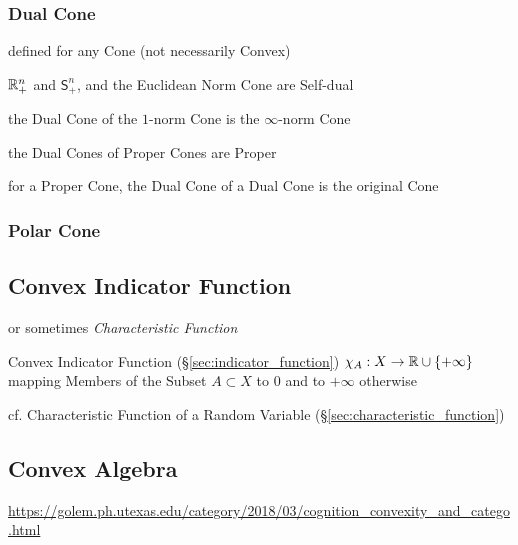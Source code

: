 {\subsubsection{Dual Cone}\label{sec:dual_cone}

defined for any Cone (not necessarily Convex)

$\mathbb{R}_+^n$ and $\mathsf{S}_+^n$, and the Euclidean Norm Cone are Self-dual

the Dual Cone of the $1$-norm Cone is the $\infty$-norm Cone

the Dual Cones of Proper Cones are Proper

for a Proper Cone, the Dual Cone of a Dual Cone is the original Cone



\subsubsection{Polar Cone}\label{sec:polar_cone}



\subsection{Convex Indicator Function}\label{sec:convex_indicator_function}

or sometimes \emph{Characteristic Function}

Convex Indicator Function (\S\ref{sec:indicator_function})
$\chi_A : X \rightarrow \mathbb{R} \cup \{ +\infty \}$ mapping Members of the Subset
$A \subset X$ to $0$ and to $+\infty$ otherwise

\fist cf. Characteristic Function of a Random Variable
(\S\ref{sec:characteristic_function})



\subsection{Convex Algebra}\label{sec:convex_algebra}


\url{https://golem.ph.utexas.edu/category/2018/03/cognition_convexity_and_catego.html}



}
